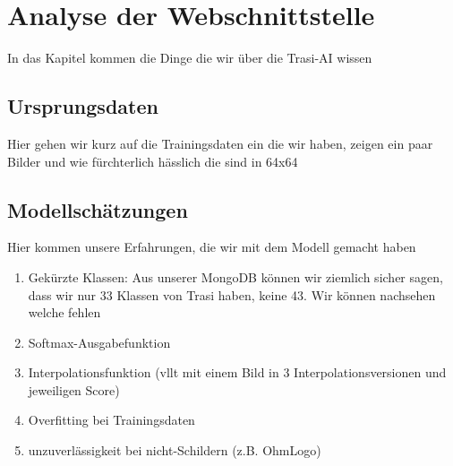 \chapter{Analyse der Webschnittstelle}
\label{cha:TrasiAnalyse}
In das Kapitel kommen die Dinge die wir über die Trasi-AI wissen
\section{Ursprungsdaten}
\label{sec:TrainingsDaten}
Hier gehen wir kurz auf die Trainingsdaten ein die wir haben, zeigen ein paar Bilder und wie fürchterlich hässlich die sind in 64x64

\section{Modellschätzungen}
\label{sec:TrasiModell}
Hier kommen unsere Erfahrungen, die wir mit dem Modell gemacht haben

\begin{enumerate}
	\item Gekürzte Klassen: Aus unserer MongoDB können wir ziemlich sicher sagen, dass wir nur 33 Klassen von Trasi haben, keine 43. Wir können nachsehen welche fehlen
	\item Softmax-Ausgabefunktion
	\item Interpolationsfunktion (vllt mit einem Bild in 3 Interpolationsversionen und jeweiligen Score) 
	\item Overfitting bei Trainingsdaten
	\item unzuverlässigkeit bei nicht-Schildern (z.B. OhmLogo)
\end{enumerate}

